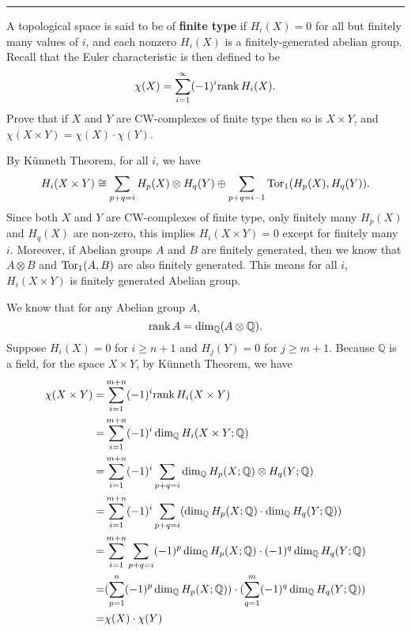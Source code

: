 \documentclass[letterpaper, 12pt]{article}
\begin{document}
\noindent\rule{7in}{2.8pt}
\begin{problem}{2}
A topological space is said to be of \textbf{finite type} if \(H_i(X)=0\) for all but finitely many values of \(i\), and each nonzero \(H_i(X)\) is a finitely-generated abelian group. Recall that the Euler characteristic is then defined to be 
\[\chi(X)=\sum_{i=1}^{\infty}(-1)^i\text{rank}\, H_i(X).\]
Prove that if \(X\) and \(Y\) are CW-complexes of finite type then so is \(X\times Y\), and \(\chi(X\times Y)=\chi(X)\cdot \chi(Y)\).
\end{problem}
\begin{solution}
By Künneth Theorem, for all \(i\), we have 
\[H_i(X\times Y)\cong \sum_{p+q=i} H_p(X)\otimes H_q(Y)\oplus \sum_{p+q=i-1} \text{Tor}_1(H_p(X),H_q(Y)).\]
Since both \(X\) and \(Y\) are CW-complexes of finite type, only finitely many \(H_p(X)\) and \(H_q(X)\) are non-zero, this implies \(H_i(X\times Y)=0\) except for finitely many \(i\). Moreover, if Abelian groups \(A\) and \(B\) are finitely generated, then we know that \(A\otimes B\) and \(\text{Tor}_1(A,B)\) are also finitely generated. This means for all \(i\), \(H_i(X\times Y)\) is finitely generated Abelian group. 

We know that for any Abelian group \(A\), 
\[\text{rank}\, A=\dim_\mathbb{Q} (A\otimes \mathbb{Q}).\]
Suppose \(H_i(X)=0\) for \(i\geq n+1\) and \(H_j(Y)=0\) for \(j\geq m+1\). Because \(\mathbb{Q}\) is a field, for the space \(X\times Y\), by Künneth Theorem, we have 
\begin{align*}
    \chi(X\times Y)=&\sum_{i=1}^{m+n}(-1)^i\text{rank}\, H_i(X\times Y)\\ 
            =&\sum_{i=1}^{m+n}(-1)^i\dim_\mathbb{Q} H_i(X\times Y;\mathbb{Q})\\ 
            =&\sum_{i=1}^{m+n}(-1)^i\sum_{p+q=i}\dim_\mathbb{Q} H_p(X;\mathbb{Q})\otimes H_q(Y;\mathbb{Q})\\ 
            =&\sum_{i=1}^{m+n}(-1)^i\sum_{p+q=i}(\dim_\mathbb{Q} H_p(X;\mathbb{Q})\cdot \dim_\mathbb{Q} H_q(Y;\mathbb{Q}))\\ 
            =&\sum_{i=1}^{m+n}\sum_{p+q=i}(-1)^p\dim_\mathbb{Q} H_p(X;\mathbb{Q})\cdot (-1)^q\dim_\mathbb{Q} H_q(Y;\mathbb{Q})\\ 
            =&(\sum_{p=1}^{n}(-1)^p\dim_\mathbb{Q} H_p(X;\mathbb{Q}))\cdot (\sum_{q=1}^{m}(-1)^q \dim_\mathbb{Q} H_q(Y;\mathbb{Q}))\\ 
            =&\chi(X)\cdot \chi(Y)
\end{align*}
\end{solution}
\end{document}
